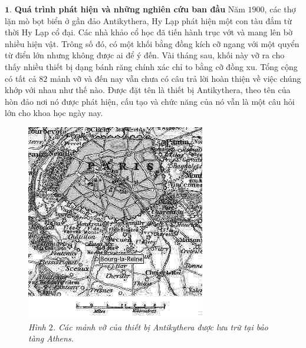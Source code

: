 \begin{multicols}{2}
	\vskip 0.1cm
	$\pmb{1.}$ \textbf{\color{lichsutoanhoc}Quá trình phát hiện và những nghiên cứu ban đầu}
	\vskip 0.1cm
	Năm $1900$, các thợ lặn mò bọt biển ở gần đảo Antikythera, Hy Lạp phát hiện một con tàu đắm từ thời Hy Lạp cổ đại. Các nhà khảo cổ học đã tiến hành trục vớt và mang lên bờ nhiều hiện vật. Trông số đó, có một khối bằng đồng kích cỡ ngang với một quyển từ điển lớn nhưng không được ai để ý đến. Vài tháng sau, khối này vỡ ra cho thấy nhiều thiết bị dạng bánh răng chính xác chỉ to bằng cỡ đồng xu. Tổng cộng có tất cả $82$ mảnh vỡ và đến nay vẫn chưa có câu trả lời hoàn thiện về việc chúng khớp với nhau như thế nào. Được đặt tên là thiết bị Antikythera, theo tên của hòn đảo nơi nó được phát hiện, cấu tạo và chức năng của nó vẫn là một câu hỏi lớn cho khoa học ngày nay.
	\begin{figure}[H]
		\vspace*{-5pt}
		\centering
		\captionsetup{labelformat= empty, justification=centering}
		\includegraphics[width= 1\linewidth]{2}
		\caption{\small\textit{\color{lichsutoanhoc}Hình $2$. Các mảnh vỡ của thiết bị Antikythera được lưu trữ tại bảo tàng Athens.}}
		\vspace*{-10pt}
	\end{figure}

\end{multicols}
